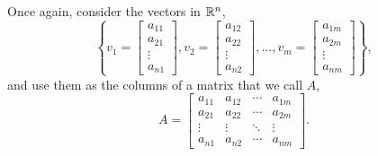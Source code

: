 Once again, consider the vectors in $\mathbb R^n$,
$$\left\{v_1=\begin{bmatrix} a_{11} \\ a_{21}\\ \vdots \\ a_{n1} \end{bmatrix},  v_2=\begin{bmatrix} a_{12} \\ a_{22}\\ \vdots \\ a_{n2} \end{bmatrix}, ...,  v_m=\begin{bmatrix} a_{1m} \\ a_{2m}\\ \vdots \\ a_{nm} \end{bmatrix} \right\},$$ 
and use them as the columns of a matrix that we call $A$,
\begin{equation}
\label{eq:MatrixFromLinearIndependence_proTipC02}    
A=\left[\begin{array}{cccc} a_{11}& a_{12}& \cdots & a_{1m} \\
 a_{21}& a_{22}& \cdots & a_{2m}  \\
 \vdots & \vdots&  \ddots & \vdots \\
 a_{n1}& a_{n2}& \cdots & a_{nm} 
 \end{array}\right].
 \end{equation}

